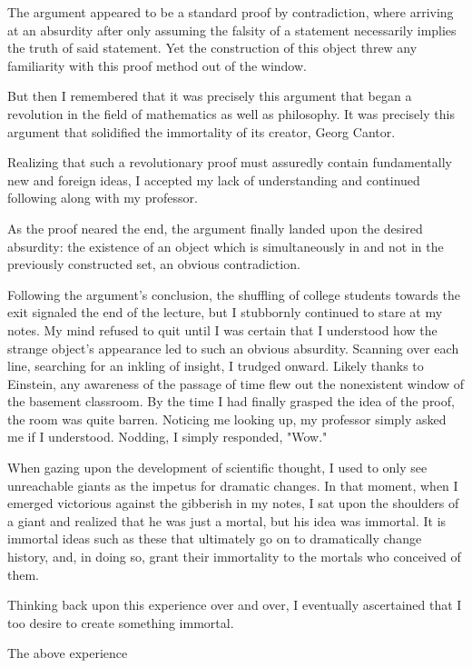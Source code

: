 \documentclass[12pt]{article}
\begin{document}
The argument appeared to be a standard proof by contradiction, where arriving at an absurdity after only assuming the falsity of a statement necessarily implies the truth of said statement. Yet the construction of this object threw any familiarity with this proof method out of the window.

But then I remembered that it was precisely this argument that began a revolution in the field of mathematics as well as philosophy. It was precisely this argument that solidified the immortality of its creator, Georg Cantor.

Realizing that such a revolutionary proof must assuredly contain fundamentally new and foreign ideas, I accepted my lack of understanding and continued following along with my professor.

As the proof neared the end, the argument finally landed upon the desired absurdity: the existence of an object which is simultaneously in and not in the previously constructed set, an obvious contradiction.

Following the argument's conclusion, the shuffling of college students towards the exit signaled the end of the lecture, but I stubbornly continued to stare at my notes. My mind refused to quit until I was certain that I understood how the strange object's appearance led to such an obvious absurdity. Scanning over each line, searching for an inkling of insight, I trudged onward. Likely thanks to Einstein, any awareness of the passage of time flew out the nonexistent window of the basement classroom. By the time I had finally grasped the idea of the proof, the room was quite barren. Noticing me looking up, my professor simply asked me if I understood. Nodding, I simply responded, "Wow."

When gazing upon the development of scientific thought, I used to only see unreachable giants as the impetus for dramatic changes. In that moment, when I emerged victorious against the gibberish in my notes, I sat upon the shoulders of a giant and realized that he was just a mortal, but his idea was immortal. It is immortal ideas such as these that ultimately go on to dramatically change history, and, in doing so, grant their immortality to the mortals who conceived of them.

Thinking back upon this experience over and over, I eventually ascertained that I too desire to create something immortal.

The above experience
\end{document}

